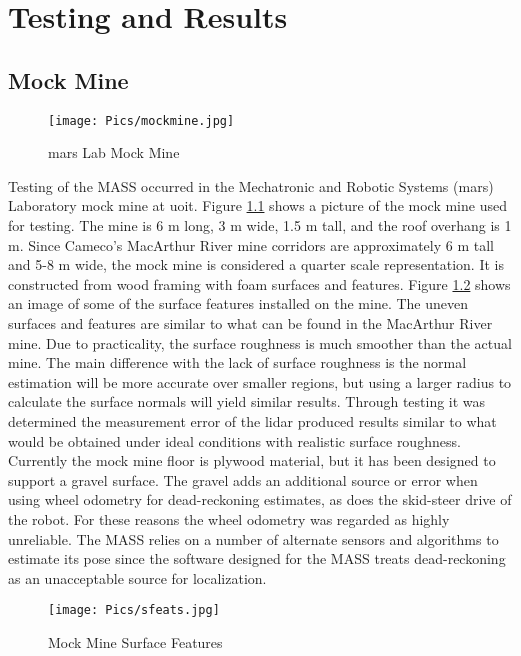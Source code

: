 \chapter{Testing and Results}
\label{chap:testing}

\section{Mock Mine}
\label{sec:mine}
\begin{figure}
    \centering
    \texttt{[image: Pics/mockmine.jpg]}
    \caption{\acrshort{mars} Lab Mock Mine}
    \label{fig:mockmine}
\end{figure}
Testing of the MASS occurred in the Mechatronic and Robotic Systems (\acrshort{mars}) Laboratory mock mine at \acrshort{uoit}. Figure \ref{fig:mockmine} shows a picture of the mock mine used for testing. The mine is 6 m long, 3 m wide, 1.5 m tall, and the roof overhang is 1 m. Since Cameco's MacArthur River mine corridors are approximately 6 m tall and 5-8 m wide, the mock mine is considered a quarter scale representation. It is constructed from wood framing with foam surfaces and features. Figure \ref{fig:surfacefeature} shows an image of some of the surface features installed on the mine. The uneven surfaces and features are similar to what can be found in the MacArthur River mine. Due to practicality, the surface roughness is much smoother than the actual mine. The main difference with the lack of surface roughness is the normal estimation will be more accurate over smaller regions, but using a larger radius to calculate the surface normals will yield similar results. Through testing it was determined the measurement error of the \acrshort{lidar} produced results similar to what would be obtained under ideal conditions with realistic surface roughness. Currently the mock mine floor is plywood material, but it has been designed to support a gravel surface. The gravel adds an additional source or error when using wheel odometry for dead-reckoning estimates, as does the skid-steer drive of the robot. For these reasons the wheel odometry was regarded as highly unreliable. The MASS relies on a number of alternate sensors and algorithms to estimate its pose since the software designed for the MASS treats dead-reckoning as an unacceptable source for localization.\\
\begin{figure}[htb]
    \centering
    \texttt{[image: Pics/sfeats.jpg]}
    \caption{Mock Mine Surface Features}
    \label{fig:surfacefeature}
\end{figure}
\clearpage
